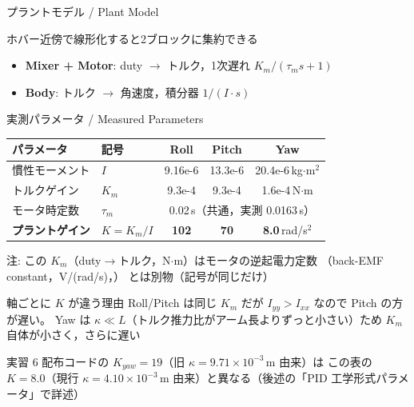 \begin{frame}{プラントモデル / Plant Model}
  \begin{center}
    \vspace{-2mm}
    \resizebox{0.85\textwidth}{!}{}
  \end{center}

  \vspace{-0.5em}

  \begin{exampleblock}{ホバー近傍で線形化すると2ブロックに集約できる}
    \begin{itemize}
      \item \textbf{Mixer + Motor}: duty $\to$ トルク，1次遅れ $K_m/(\tau_m s+1)$
      \item \textbf{Body}: トルク $\to$ 角速度，積分器 $1/(I \cdot s)$
    \end{itemize}
  \end{exampleblock}
\end{frame}

\begin{frame}{実測パラメータ / Measured Parameters}
  \begin{table}
    \centering\small
    \begin{tabular}{llccc}
      \hline
      \textbf{パラメータ} & \textbf{記号} & \textbf{Roll} & \textbf{Pitch} & \textbf{Yaw} \\
      \hline
      慣性モーメント & $I$ & 9.16e-6 & 13.3e-6 & 20.4e-6\,kg$\cdot$m$^2$ \\
      トルクゲイン   & $K_m$ & 9.3e-4 & 9.3e-4 & 1.6e-4\,N$\cdot$m \\
      モータ時定数   & $\tau_m$ & \multicolumn{3}{c}{0.02\,s（共通，実測 0.0163\,s）} \\
      \hline
      \textbf{プラントゲイン} & $K = K_m/I$ & \textbf{102} & \textbf{70} & \textbf{8.0}\,rad/s$^2$ \\
      \hline
    \end{tabular}
  \end{table}

  {\tiny 注: この $K_m$（duty$\to$トルク，N$\cdot$m）はモータの逆起電力定数
  （back-EMF constant，V/(rad/s)，）
  とは別物（記号が同じだけ）}

  \vspace{0.3em}

  \begin{exampleblock}{軸ごとに $K$ が違う理由}
    \footnotesize
    Roll/Pitch は同じ $K_m$ だが $I_{yy} > I_{xx}$ なので Pitch の方が遅い。
    Yaw は $\kappa \ll L$（トルク推力比がアーム長よりずっと小さい）ため
    $K_m$ 自体が小さく，さらに遅い
  \end{exampleblock}

  {\scriptsize 実習 6 配布コードの $K_{yaw}=19$（旧 $\kappa=9.71\times10^{-3}$\,m 由来）は
  この表の $K=8.0$（現行 $\kappa=4.10\times10^{-3}$\,m 由来）と異なる（後述の「PID 工学形式パラメータ」で詳述）}
\end{frame}

